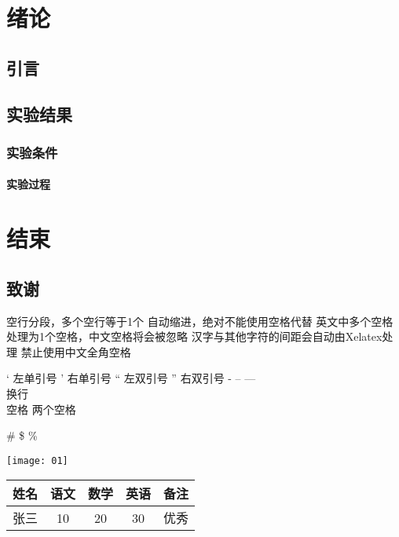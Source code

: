 \documentclass[utf8 10pt]{article}  %
\begin{document}
    \tableofcontents


    \chapter{绪论}


    \section{引言}


    \section{实验结果}

    \subsection{实验条件}

    \subsubsection{实验过程}


    \chapter{结束}


    \section{致谢}


    空行分段，多个空行等于1个
    自动缩进，绝对不能使用空格代替
    英文中多个空格处理为1个空格，中文空格将会被忽略
    汉字与其他字符的间距会自动由Xelatex处理
    禁止使用中文全角空格

    ` 左单引号
    ' 右单引号
    `` 左双引号
    '' 右双引号
    -
    --
    ---
    \\ 换行\\
    空\quad 格
    两个\qquad 空格

    \#
    \$
    \%


    \graphicspath{{../result/}}   %
    \texttt{[image: 01]}          %

    \begin{tabular}{|l |c|| c| c| p{1.5cm}|}     %
        \hline \hline%
        姓名 & 语文 & 数学 & 英语 & 备注 \\
        \hline %
        张三 & 10 & 20 & 30 & 优秀 \\
        \hline
    \end{tabular}
\end{document}
